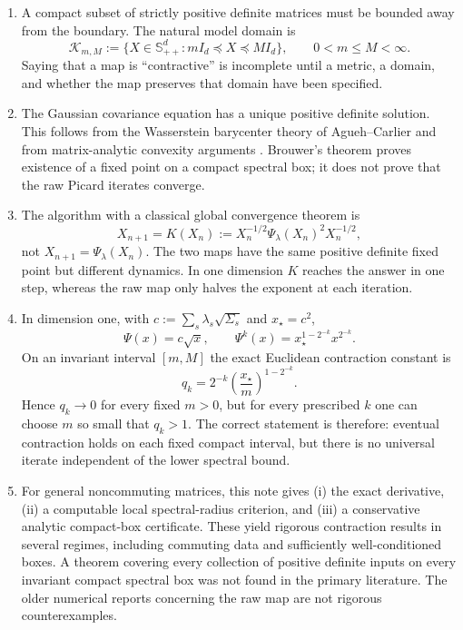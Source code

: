\documentclass[11pt]{article}
\theoremstyle{definition}
\newcommand{\Spp}{\mathbb S_{++}^d}
\newcommand{\Id}{I_d}
\newcommand{\cK}{\mathcal K}
\begin{document}
\begin{enumerate}
  \item A compact subset of strictly positive definite matrices must be bounded
  away from the boundary.  The natural model domain is
  \[
    \cK_{m,M}:=\{X\in\Spp:m\Id\preceq X\preceq M\Id\},
    \qquad 0<m\leq M<\infty.
  \]
  Saying that a map is ``contractive'' is incomplete until a metric, a domain,
  and whether the map preserves that domain have been specified.

  \item The Gaussian covariance equation has a unique positive definite
  solution.  This follows from the Wasserstein barycenter theory of
  Agueh--Carlier and from matrix-analytic convexity arguments
  \cite{AguehCarlier2011,BhatiaJainLim2019}.  Brouwer's theorem proves existence
  of a fixed point on a compact spectral box; it does not prove that the raw
  Picard iterates converge.

  \item The algorithm with a classical global convergence theorem is
  \[
    X_{n+1}=K(X_n):=X_n^{-1/2}\Psi_\lambda(X_n)^2X_n^{-1/2},
  \]
  not $X_{n+1}=\Psi_\lambda(X_n)$.  The two maps have the same positive
  definite fixed point but different dynamics.  In one dimension $K$ reaches
  the answer in one step, whereas the raw map only halves the exponent at each
  iteration.

  \item In dimension one, with
  $c:=\sum_s\lambda_s\sqrt{\Sigma_s}$ and $x_\star=c^2$,
  \[
    \Psi(x)=c\sqrt{x},\qquad
    \Psi^k(x)=x_\star^{1-2^{-k}}x^{2^{-k}}.
  \]
  On an invariant interval $[m,M]$ the exact Euclidean contraction constant is
  \[
    q_k=2^{-k}\left(\frac{x_\star}{m}\right)^{1-2^{-k}}.
  \]
  Hence $q_k\to0$ for every fixed $m>0$, but for every prescribed $k$ one can
  choose $m$ so small that $q_k>1$.  The correct statement is therefore:
  eventual contraction holds on each fixed compact interval, but there is no
  universal iterate independent of the lower spectral bound.

  \item For general noncommuting matrices, this note gives (i) the exact
  derivative, (ii) a computable local spectral-radius criterion, and (iii) a
  conservative analytic compact-box certificate.  These yield rigorous
  contraction results in several regimes, including commuting data and
  sufficiently well-conditioned boxes.  A theorem covering every collection
  of positive definite inputs on every invariant compact spectral box was not
  found in the primary literature.  The older numerical reports concerning
  the raw map are not rigorous counterexamples.


\end{enumerate}
\end{document}
